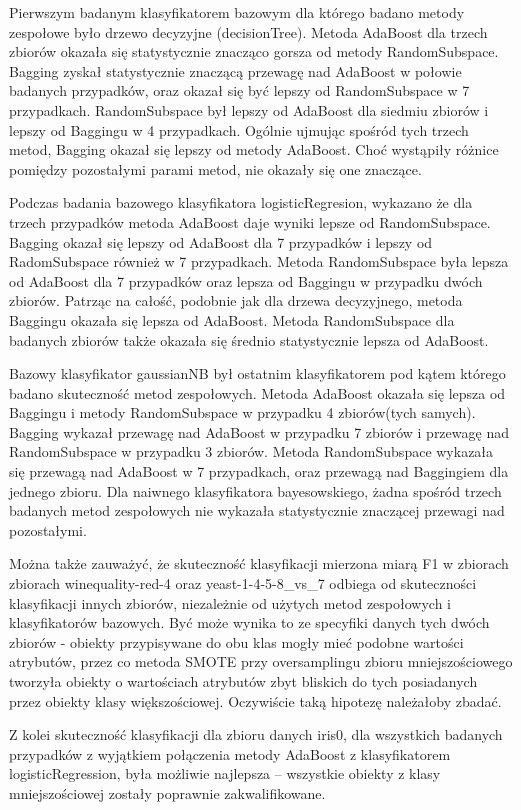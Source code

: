 \documentclass[a4paper,12pt]{article}
\begin{document}
Pierwszym badanym klasyfikatorem bazowym dla którego badano metody zespołowe było drzewo decyzyjne (decisionTree). Metoda AdaBoost dla trzech zbiorów okazała się statystycznie znacząco gorsza od metody RandomSubspace. Bagging zyskał statystycznie znaczącą przewagę nad AdaBoost w połowie badanych przypadków, oraz okazał się być lepszy od RandomSubspace w 7 przypadkach. RandomSubspace był lepszy od AdaBoost dla siedmiu zbiorów i lepszy od Baggingu w 4 przypadkach. Ogólnie ujmując spośród tych trzech metod, Bagging okazał się lepszy od metody AdaBoost. Choć wystąpiły różnice pomiędzy pozostałymi parami metod, nie okazały się one znaczące.

Podczas badania bazowego klasyfikatora logisticRegresion, wykazano że dla trzech przypadków metoda AdaBoost daje wyniki lepsze od RandomSubspace. Bagging okazał się lepszy od AdaBoost dla 7 przypadków i lepszy od RadomSubspace również w 7 przypadkach. Metoda RandomSubspace była lepsza od AdaBoost dla 7 przypadków oraz lepsza od Baggingu w przypadku dwóch zbiorów. Patrząc na całość, podobnie jak dla drzewa decyzyjnego, metoda Baggingu okazała się lepsza od AdaBoost. Metoda RandomSubspace dla badanych zbiorów także okazała się średnio statystycznie lepsza od AdaBoost.

Bazowy klasyfikator gaussianNB był ostatnim klasyfikatorem pod kątem którego badano skuteczność metod zespołowych. Metoda AdaBoost okazała się lepsza od Baggingu i metody RandomSubspace w przypadku 4 zbiorów(tych samych). Bagging wykazał przewagę nad AdaBoost w przypadku 7 zbiorów i przewagę nad RandomSubspace w przypadku 3 zbiorów. Metoda RandomSubspace wykazała się przewagą nad AdaBoost w 7 przypadkach, oraz przewagą nad Baggingiem dla jednego zbioru. Dla naiwnego klasyfikatora bayesowskiego, żadna spośród trzech badanych metod zespołowych nie wykazała statystycznie znaczącej przewagi nad pozostałymi.

Można także zauważyć, że skuteczność klasyfikacji mierzona miarą F1 w zbiorach zbiorach winequality-red-4 oraz yeast-1-4-5-8\_vs\_7 odbiega od skuteczności klasyfikacji innych zbiorów, niezależnie od użytych metod zespołowych i klasyfikatorów bazowych. Być może wynika to ze specyfiki danych tych dwóch zbiorów - obiekty przypisywane do obu klas mogły mieć podobne wartości atrybutów, przez co metoda SMOTE przy oversamplingu zbioru mniejszościowego tworzyła obiekty o wartościach atrybutów zbyt bliskich do tych posiadanych przez obiekty klasy większościowej. Oczywiście taką hipotezę należałoby zbadać.

Z kolei skuteczność klasyfikacji dla zbioru danych iris0, dla wszystkich badanych przypadków z wyjątkiem połączenia metody AdaBoost z klasyfikatorem logisticRegression, była możliwie najlepsza -- wszystkie obiekty z klasy mniejszościowej zostały poprawnie zakwalifikowane.
\end{document}
